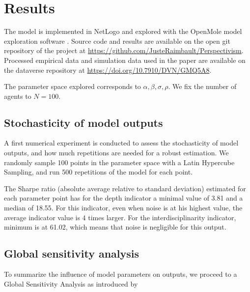 \documentclass[utf8]{frontiersFPHY} %
\begin{document}
\section{Results}


The model is implemented in NetLogo \cite{tisue2004netlogo} and explored with the OpenMole model exploration software \cite{reuillon2013openmole}. Source code and results are available on the open git repository of the project at \url{https://github.com/JusteRaimbault/Perspectivism}. Processed empirical data and simulation data used in the paper are available on the dataverse repository at \url{https://doi.org/10.7910/DVN/GMQ5A8}.

The parameter space explored corresponds to $\alpha,\beta,\sigma,\rho$.
We fix the number of agents to $N=100$.

\subsection{Stochasticity of model outputs}

A first numerical experiment is conducted to assess the stochasticity of model outputs, and how much repetitions are needed for a robust estimation. We randomly sample 100 points in the parameter space with a Latin Hypercube Sampling, and run 500 repetitions of the model for each point. 

The Sharpe ratio (absolute average relative to standard deviation) estimated for each parameter point has for the depth indicator a minimal value of 3.81 and a median of 18.55. For this indicator, even when noise is at his highest value, the average indicator value is 4 times larger. For the interdisciplinarity indicator, minimum is at 61.02, which means that noise is negligible for this output.


\subsection{Global sensitivity analysis}


To summarize the influence of model parameters on outputs, we proceed to a Global Sensitivity Analysis as introduced by \cite{}
\end{document}
